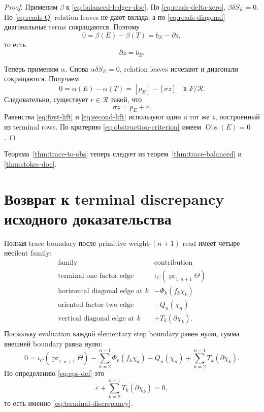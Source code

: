 \documentclass[11pt,a4paper]{article}
\theoremstyle{definition}
\theoremstyle{remark}
\newcommand{\pr}{\operatorname{pr}}
\newcommand{\Rel}{\mathcal R}
\newcommand{\Obs}{\operatorname{Obs}}
\newcommand{\eps}{\varepsilon}
\begin{document}
\begin{proof}
Применим $\beta$ к \eqref{eq:balanced-ledger-doc}. По
\eqref{eq:reads-delta-zero}, $\beta\delta S_E=0$. По
\eqref{eq:reads-Q} relation leaves не дают вклада, а по
\eqref{eq:reads-diagonal} диагональные terms сокращаются. Поэтому
\[
 0=\beta(E)-\beta(T)=b_E-\partial z,
\]
то есть
\begin{equation}\label{eq:first-lift}
 \partial z=b_E.
\end{equation}

Теперь применим $\alpha$. Снова $\alpha\delta S_E=0$, relation leaves
исчезают и диагонали сокращаются. Получаем
\[
 0=\alpha(E)-\alpha(T)=[p_E]-[\sigma z]\quad\text{в }F/\Rel.
\]
Следовательно, существует $r\in\Rel$ такой, что
\begin{equation}\label{eq:second-lift}
 \sigma z=p_E+r.
\end{equation}
Равенства \eqref{eq:first-lift} и \eqref{eq:second-lift} используют один и
тот же $z$, построенный из terminal rows. По критерию
\eqref{eq:obstruction-criterion} имеем $\Obs(E)=0$.
\end{proof}

Теорема~\ref{thm:trace-to-obs} теперь следует из
теорем~\ref{thm:trace-balanced} и \ref{thm:stokes-doc}.

\section{Возврат к terminal discrepancy исходного доказательства}

Полная trace boundary после primitive weight-$(n+1)$ read имеет четыре
несilent family:
\[
 \begin{array}{c|c}
 \text{family} & \text{contribution}\\
 \hline
 \text{terminal one-factor edge}
   & \iota_C(\pr_{1,n+1}\Theta)\\
 \text{horizontal diagonal edge at }k
   & -\Phi_k(f_k\chi_k)\\
 \text{oriented factor-two edge}
   & -Q_n(\chi_n)\\
 \text{vertical diagonal edge at }k
   & +T_k(\partial\chi_k).\\
 \end{array}
\]
Поскольку evaluation каждой elementary step boundary равен нулю, сумма
внешней boundary равна нулю:
\begin{equation}\label{eq:global-external}
 0=
 \iota_C(\pr_{1,n+1}\Theta)
 -\sum_{k=2}^{n-1}\Phi_k(f_k\chi_k)
 -Q_n(\chi_n)
 +\sum_{k=2}^{n-1}T_k(\partial\chi_k).
\end{equation}
По определению \eqref{eq:eps-def} это
\[
 \eps+\sum_{k=2}^{n-1}T_k(\partial\chi_k)=0,
\]
то есть именно \eqref{eq:terminal-discrepancy}.
\end{document}
